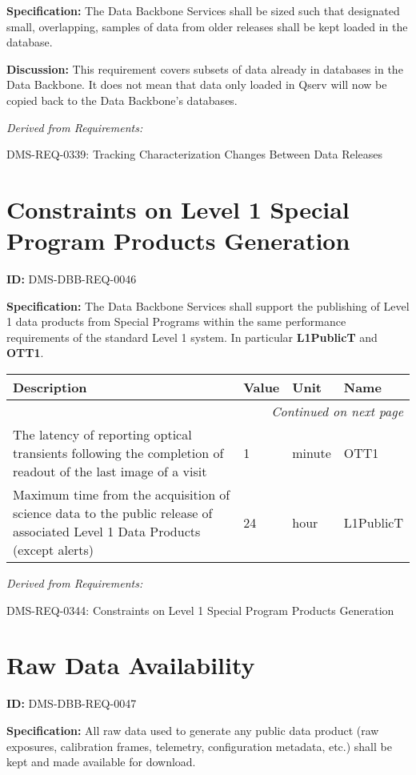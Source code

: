 \documentclass[SE,toc,lsstdraft]{lsstdoc}
\makeatletter
\newcommand{\paramname}[1]{\hspace{0pt}#1}
\newcommand{\unitname}[1]{\hspace{0pt}#1}
\newenvironment{parameters}[0]{%
\setlength\LTleft{0pt}
\setlength\LTright{\fill}
\begin{small}
\begin{longtable}[]{|p{0.49\textwidth}|l|p{0.6in}|p{1.70in}@{}|}

\hline \textbf{Description} & \textbf{Value} & \textbf{Unit} & \textbf{Name} \\ \hline
\endhead

\hline \multicolumn{4}{r}{\emph{Continued on next page}} \\
\endfoot

\hline\hline
\endlastfoot
}{%
\hline
\end{longtable}
\end{small}
}
\makeatother
\begin{document}
\textbf{Specification:}
The Data Backbone Services shall be sized such that designated small, overlapping, samples of data from older releases shall be kept loaded in the database.

\textbf{Discussion:}
This requirement covers subsets of data already in databases in the Data Backbone.    It does not mean that data only loaded in Qserv will now be copied back to the Data Backbone's databases.

\emph{Derived from Requirements:}

DMS-REQ-0339:
Tracking Characterization Changes Between Data Releases \newline

\section{Constraints on Level 1 Special Program Products Generation}

\label{DMS-DBB-REQ-0046}
\textbf{ID:} DMS-DBB-REQ-0046

\textbf{Specification:}
The Data Backbone Services shall support the publishing of Level 1 data products from Special Programs within the same performance requirements of the standard Level 1 system. In particular \textbf{L1PublicT} and \textbf{OTT1}.

\begin{parameters}
The latency of reporting optical transients following the completion of readout of the last image of a visit
&
1
&
\unitname{%
minute
}
&
\paramname{%
OTT1
} \\\hline
Maximum time from the acquisition of science data to the public release of associated Level 1 Data Products (except alerts)
&
24
&
\unitname{%
hour
}
&
\paramname{%
L1PublicT
} \\\hline
\end{parameters}

\emph{Derived from Requirements:}

DMS-REQ-0344:
Constraints on Level 1 Special Program Products Generation \newline

\section{Raw Data Availability}

\label{DMS-DBB-REQ-0047}
\textbf{ID:} DMS-DBB-REQ-0047

\textbf{Specification:}
All raw data used to generate any public data product (raw exposures, calibration
frames, telemetry, configuration metadata, etc.) shall be kept and made available for
download.
\end{document}
